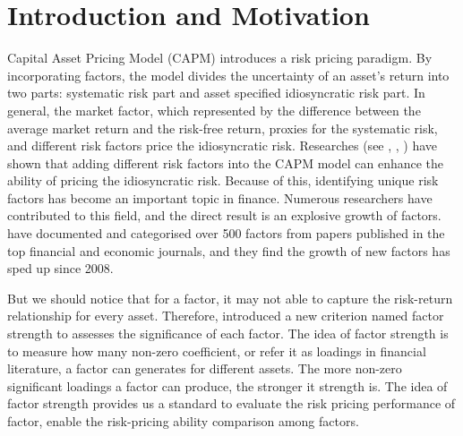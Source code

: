 \chapter{Introduction and Motivation}
Capital Asset Pricing Model (CAPM) \cite{Sharpe1964, Lintner1965, Black1972} introduces a risk pricing paradigm.
By incorporating factors, the model divides the uncertainty of an asset's return into two parts: systematic risk part and asset specified idiosyncratic risk part.
In general, the market factor, which represented by the difference between the average market return and the risk-free return, proxies for the systematic risk, and different risk factors price the idiosyncratic risk.
Researches (see , , ) have shown that adding different risk factors into the CAPM model can enhance the ability of pricing the idiosyncratic risk.
Because of this, identifying unique risk factors has become an important topic in finance.
Numerous researchers have contributed to this field, and the direct result is an explosive growth of factors.
  have documented and categorised over 500 factors from papers published in the top financial and economic journals, and they find the growth of new factors has sped up since 2008. 
 
But we should notice that for a factor, it may not able to capture the risk-return relationship for every asset.
Therefore,  introduced a new criterion named factor strength to assesses the significance of each factor.
The idea of factor strength is to measure how many non-zero coefficient, or refer it as loadings in financial literature, a factor can generates for different assets.
The more non-zero significant loadings a factor can produce, the stronger it strength is.
The idea of factor strength provides us a standard to evaluate the risk pricing performance of factor, enable the risk-pricing ability comparison among factors.

